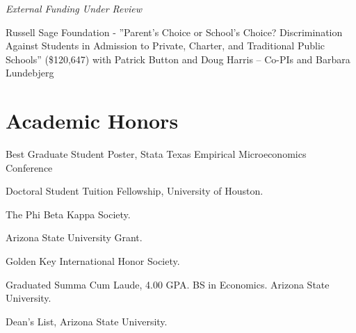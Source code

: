 \documentclass[letterpaper]{article}
\renewenvironment{itemize}{
  \begin{list}{}{
    \setlength{\leftmargin}{1.5em}
  }
}{
  \end{list}
}
\begin{document}
\vspace{2 mm}
\textit{External Funding Under Review
}\begin{itemize}
  \item {}Russell Sage Foundation - ”Parent’s Choice or School’s Choice? Discrimination Against Students in Admission to Private, Charter, and Traditional Public Schools” (\$120,647) with Patrick Button and Doug Harris – Co-PIs and  Barbara Lundebjerg
\end{itemize}

\section*{Academic Honors}
\vspace{2 mm}
\begin{itemize}
\item {} Best Graduate Student Poster, Stata Texas Empirical Microeconomics Conference
\item {} Doctoral Student Tuition Fellowship, University of Houston. 
\item {} The Phi Beta Kappa Society. 
\item {} Arizona State University Grant. 
\item {} Golden Key International Honor Society. 
\item {} Graduated Summa Cum Laude, 4.00 GPA. BS in Economics. Arizona State University. 
\item {} Dean's List, Arizona State University. 
\end{itemize}
\vspace{2 mm}
\end{document}
